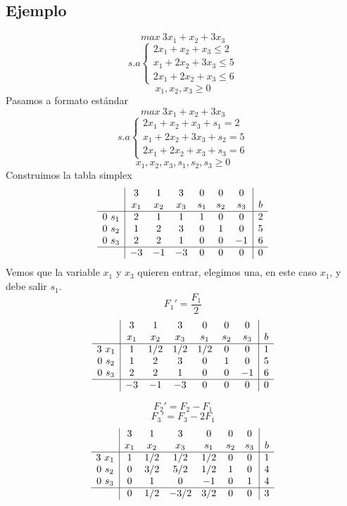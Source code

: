 \documentclass[11pt,fleqn]{book} %
\begin{document}
\subsection{Ejemplo}
$$  max ~ 3x_1+x_2+3x_3$$
$$ s.a \left\{
\begin{array}{c}
2x_1+x_2+x_3\leq2\\
x_1+2x_2+3x_3\leq 5 \\
2x_1+2x_2+x_3\leq 6
\end{array}
\right.
$$
$$x_1, x_2, x_3\geq 0$$
Pasamos a formato estándar
$$  max ~ 3x_1+x_2+3x_3$$
$$ s.a \left\{
\begin{array}{c}
2x_1+x_2+x_3 + s_1=2\\
x_1+2x_2+3x_3+ s_2 = 5 \\
2x_1+2x_2+x_3 + s_3=  6
\end{array}
\right.
$$
$$x_1, x_2, x_3, s_1, s_2, s_3 \geq 0$$
Construimos la tabla simplex
$$
\begin{array}{c|cccccc|c}
& 3 & 1 & 3 & 0 & 0 & 0 &  \\
& x_1 & x_2 & x_3 & s_1 & s_2 & s_3 & b \\ \hline
0 ~ s_1 & 2 & 1 & 1 & 1 & 0 & 0 & 2 \\
0 ~ s_2 & 1 & 2 & 3 & 0 & 1 & 0 & 5 \\
0 ~ s_3 & 2 & 2 & 1 & 0 & 0 & -1 & 6 \\ \hline
& -3 & -1 & -3 & 0 & 0 & 0 & 0
\end{array}
$$
Vemos que la variable $x_1$ y $x_3$ quieren entrar, elegimos una, en este caso $x_1$, y debe salir $s_1$. 
$$ F_1'=\frac{F_1}{2} $$
$$
\begin{array}{c|cccccc|c}
& 3 & 1 & 3 & 0 & 0 & 0 &  \\
& x_1 & x_2 & x_3 & s_1 & s_2 & s_3 & b \\ \hline
3 ~ x_1 & 1 & 1/2 & 1/2 & 1/2 & 0 & 0 & 1 \\
0 ~ s_2 & 1 & 2 & 3 & 0 & 1 & 0 & 5 \\
0 ~ s_3 & 2 & 2 & 1 & 0 & 0 & -1 & 6 \\ \hline
& -3 & -1 & -3 & 0 & 0 & 0 & 0
\end{array}
$$

$$ F_2'=F_2-F_1 $$
$$ F_3'=F_3-2F_1 $$
$$
\begin{array}{c|cccccc|c}
& 3 & 1 & 3 & 0 & 0 & 0 &  \\
& x_1 & x_2 & x_3 & s_1 & s_2 & s_3 & b \\ \hline
3 ~ x_1 & 1 & 1/2 & 1/2 & 1/2 & 0 & 0 & 1 \\
0 ~ s_2 & 0 & 3/2 & 5/2 & 1/2 & 1 & 0 & 4 \\
0 ~ s_3 & 0 & 1 & 0 & -1 & 0 & 1 & 4 \\ \hline
& 0 & 1/2 & -3/2 & 3/2 & 0 & 0 & 3
\end{array}
$$
\end{document}
